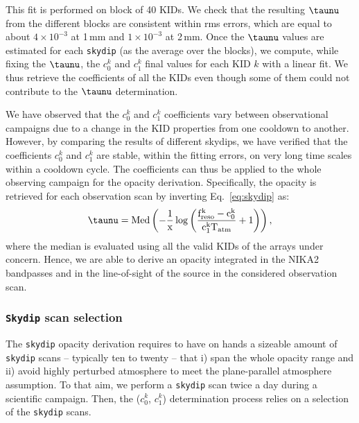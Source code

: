 %
{\lp This fit is performed on block of 40 KIDs. We check that the
resulting $\taunu$ from the different blocks are consistent within rms
errors, which are equal to about $4\times 10^{-3}$ at 1\,mm and
$1\times 10^{-3}$ at 2\,mm.}
Once the $\taunu$ values are estimated for each {\tt skydip} (as the average over the
blocks), we compute, while fixing the $\taunu$, the $c_0^k$ and $c_1^k$
final values for each KID $k$ with a linear fit. We thus retrieve
the coefficients of all the KIDs even though some of them could not
contribute to the $\taunu$ determination. %

{\lp We have observed that the  $c_0^k$ and $c_1^k$ coefficients vary
between observational campaigns due to a change in the KID properties
from one cooldown to another.}
However, by comparing the results of different skydips, we have verified that the
coefficients $c_0^k$ and $c_1^k$ are stable, within the fitting errors, on very
long time scales within a cooldown cycle. The coefficients can thus be
applied to the whole observing campaign for the opacity derivation. %
Specifically, the opacity %
is retrieved for each observation scan by
inverting Eq.~\ref{eq:skydip} as:
\begin{equation}
\taunu =   \rm{Med}\left( -\frac{1}{x} \log\left( \frac{f_{\rm{reso}}^k - c_0^k}{c_1^kT_{\rm{atm}}} +1 \right)\right), 
\end{equation}
where the median is evaluated using all the valid
KIDs of the arrays under concern. Hence, we are able to derive an opacity
integrated in the NIKA2 bandpasses and in the line-of-sight of the
source in the considered observation scan.

\subsubsection{{\tt Skydip} scan selection}
\label{se:skydip-selection}

The {\tt skydip} opacity derivation requires to have on hands a
sizeable amount of {\tt skydip} scans --
typically ten to twenty -- that i) span the whole opacity range and
ii) avoid highly perturbed atmosphere to meet the plane-parallel
atmosphere assumption. To that aim, we perform a {\tt skydip}
scan twice a day during a scientific campaign. Then, the ($c_0^k$, $c_1^k$)
determination process relies on a selection of the {\tt skydip} scans.

